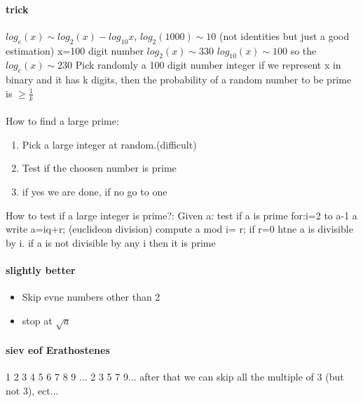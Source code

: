 \documentclass[a4paper,10pt]{article}
\begin{document}
{\paragraph{trick}
$log_e(x)\sim log_2(x)-log_{10}x$, $log_2(1000)\sim 10$ (not identities but just a good estimation)
\newline
x=100 digit number
\newline
$log_2(x)\sim 330$
\newline
$log_{10}(x)\sim 100$
\newline
so the $log_e(x)\sim 230$
\newline
Pick randomly a 100 digit number integer
\newline
if we represent x in binary and it has k digits, then the probability of  a random number to be prime is $\geq \frac{1}{k}$
\paragraph{}
How to find a large prime:
\begin{enumerate}
 \item Pick a large integer at random.(difficult)
 \item Test if the choosen number is prime
 \item if yes we are done, if no go to one
\end{enumerate}
How to test if a large integer is prime?:
\newline
Given a: test if a is prime
\newline
for:i=2 to a-1 a
\newline
write a=iq+r; (euclideon division)
\newline
compute a mod i= r;
\newline
if r=0 htne a is divisible by i.
\newline
if a is not divisible by any i then it is prime
\paragraph{slightly better}
\begin{itemize}
 \item Skip evne numbers other than 2
 \item stop  at $\sqrt{a}$
\end{itemize}
\paragraph{siev eof Erathostenes}
1 2 3 4 5 6 7 8 9 ...
 2 3 5 7 9...
\newline
after that we can skip all the multiple of 3 (but not 3), ect...
}
\end{document}
